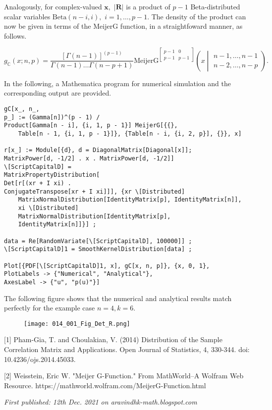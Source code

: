 Analogously, for complex-valued $\boldsymbol{x},$ $|\boldsymbol{R}|$ is a product of $p-1$ Beta-distributed scalar variables $\mathrm{Beta}(n-i,i),$  $i=1,\dots,p-1.$ The density of the product can now be given in terms of the $\mathrm{MeijerG}$ function, in a straightfoward manner, as follows.

$$g_\mathbb{C}(x;n,p) = \frac{\left[\Gamma(n-1)\right]^{(p-1)} }{\Gamma(n-1)\dots\Gamma(n-p+1)} \mathrm{MeijerG}^{\begin{bmatrix}p-1 & 0 \\ p-1 & p-1\end{bmatrix}}\left(x\middle|\begin{matrix}n-1,\dots,n-1\\ n-2,\dots,n-p\end{matrix}\right).$$

In the following, a Mathematica program for numerical simulation and the corresponding output are provided.

\begin{verbatim}
gC[x_, n_,
p_] := (Gamma[n])^(p - 1) /
Product[Gamma[n - i], {i, 1, p - 1}] MeijerG[{{},
	Table[n - 1, {i, 1, p - 1}]}, {Table[n - i, {i, 2, p}], {}}, x]

r[x_] := Module[{d}, d = DiagonalMatrix[Diagonal[x]]; 
MatrixPower[d, -1/2] . x . MatrixPower[d, -1/2]]
\[ScriptCapitalD] =
MatrixPropertyDistribution[
Det[r[(xr + I xi) .
ConjugateTranspose[xr + I xi]]], {xr \[Distributed]
	MatrixNormalDistribution[IdentityMatrix[p], IdentityMatrix[n]],
	xi \[Distributed]
	MatrixNormalDistribution[IdentityMatrix[p],
	IdentityMatrix[n]]}] ;

data = Re[RandomVariate[\[ScriptCapitalD], 100000]] ;
\[ScriptCapitalD]1 = SmoothKernelDistribution[data] ;

Plot[{PDF[\[ScriptCapitalD]1, x], gC[x, n, p]}, {x, 0, 1},
PlotLabels -> {"Numerical", "Analytical"},
AxesLabel -> {"u", "p(u)"}]
\end{verbatim}

The following figure shows that the numerical and analytical results match perfectly for the example case $n=4, k=6.$

\begin{figure}[H]
	\centering
	\texttt{[image: 014\_001\_Fig\_Det\_R.png]}
\end{figure}

[1] Pham-Gia, T. and Choulakian, V. (2014) Distribution of the Sample Correlation Matrix and      Applications. Open Journal of Statistics, 4, 330-344. doi: 10.4236/ojs.2014.45033.

[2] Weisstein, Eric W. "Meijer G-Function." From MathWorld--A Wolfram Web Resource. https://mathworld.wolfram.com/MeijerG-Function.html

\emph{First published: 12th Dec. 2021 on aravindhk-math.blogspot.com}
